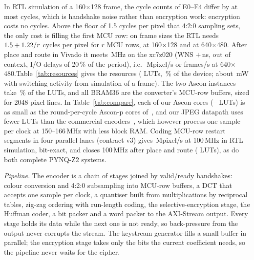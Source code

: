 \documentclass{ieeeaccess}
\newif\ifextended
\begin{document}
In RTL simulation of a 160$\times$128 frame, the cycle counts of E0--E4 differ by at most \MaxExtraCycles{} cycles, which is handshake noise rather than encryption work: encryption costs no cycles. Above the floor of 1.5 cycles per pixel that 4:2:0 sampling sets, the only cost is filling the first MCU row: on \NumScaleSizes{} frame sizes the RTL needs $1.5+1.22/r$ cycles per pixel for $r$ MCU rows, \CyclesPerPixel{} at 160$\times$128 and \CppVGA{} at 640$\times$480. After place and route in Vivado it meets \TopMhz\,MHz on the xc7z020 (WNS $+$\TopWns\,ns, out of context, I/O delays of 20\,\% of the period), i.e.\ \TopMpix\,Mpixel/s or \FpsVGA{} frames/s at 640$\times$480.\ifextended{} This took pipelining three paths that simulation cannot expose (the DCT row sum, first run 47\,MHz, the DMA-to-converter path and the zig-zag stage) without changing an output bit.\fi Table~\ref{tab:resources} gives the resources (\TopLuts{} LUTs, \TopLutPct\,\% of the device; about \SaifTopMw\,mW with switching activity from simulation of a frame). The two Ascon instances take \CryptoLutShare\,\% of the LUTs, and all \ConvBram{} BRAM36 are the converter's MCU-row buffers, sized for 2048-pixel lines. In Table~\ref{tab:compare}, each of our Ascon cores (\AsconLutMin--\AsconLutMax{} LUTs) is as small as the round-per-cycle Ascon-p cores of~\cite{khairallah2023}, and our JPEG datapath uses fewer LUTs than the commercial encoders~\cite{logijpge,castjpeg}, which however process one sample per clock at 150--166\,MHz with less block RAM. Coding MCU-row restart segments in four parallel lanes (contract v3\ifextended, Section~\ref{sec:further}\fi) gives \RtlFourLanesMpix\,Mpixel/s at 100\,MHz in RTL simulation, bit-exact, and closes 100\,MHz after place and route (\FourLanesLuts{} LUTs\ifextended, \FourLanesDsp{} DSPs, WNS $\FourLanesWns$\,ns; with two lanes, E5 draws \SaifLanesEfiveMw\,mW against \SaifLanesEtwoMw\,mW for E2\fi), as do both complete PYNQ-Z2 systems\ifextended, Zynq PS and AXI DMA with either the single pipeline or two lanes on a 64-bit pixel stream (WNS $\OverlayWns$ and $\OverlayLanesWns$\,ns)\fi.

\ifextended
\textit{Pipeline.} The encoder is a chain of stages joined by valid/ready handshakes: colour conversion and 4:2:0 subsampling into MCU-row buffers, a DCT that accepts one sample per clock, a quantiser built from multiplications by reciprocal tables, zig-zag ordering with run-length coding, the selective-encryption stage, the Huffman coder, a bit packer and a word packer to the AXI-Stream output. Every stage holds its data while the next one is not ready, so back-pressure from the output never corrupts the stream. The keystream generator fills a small buffer in parallel; the encryption stage takes only the bits the current coefficient needs, so the pipeline never waits for the cipher.
\end{document}
